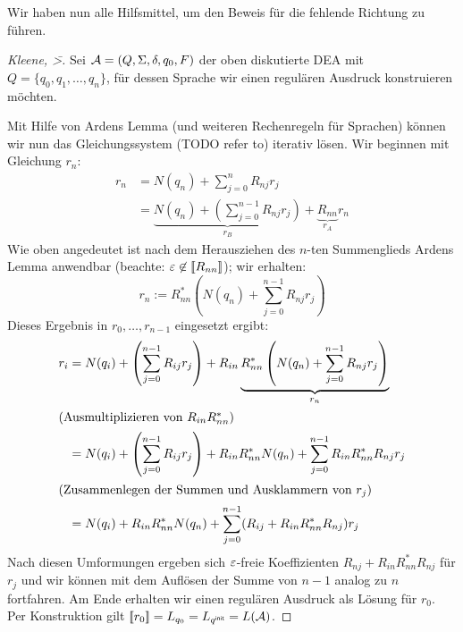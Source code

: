 
\medskip

Wir haben nun alle Hilfsmittel, um den Beweis für die fehlende Richtung zu führen.

\begin{proof}[Kleene, \=>]
  Sei $\mathcal{A}=({Q},\Sigma,\delta,q_0,F)$ der oben diskutierte \acs*{DEA} mit $Q = \{q_0,q_1,\dots,q_n\}$, für dessen Sprache wir einen regulären Ausdruck konstruieren möchten.
  
  Mit Hilfe von Ardens Lemma (und weiteren Rechenregeln für Sprachen) können wir nun das Gleichungssystem (TODO refer to) iterativ lösen.
    Wir beginnen mit Gleichung $r_n$:
    \begin{align*}
      r_n &= N(q_n) + \sum_{j = 0}^n R_{nj} r_j \\
          &= \underbrace{N(q_n) + \left (\sum_{j = 0}^{n-1} R_{nj} r_j \right)}_{r_B} + \underbrace{R_{nn}}_{r_A} r_n
    \end{align*}
    Wie oben angedeutet ist nach dem Herausziehen des $n$-ten Summenglieds Ardens Lemma anwendbar (beachte: $\varepsilon \not \in [\![ R_{nn} ]\!]$); wir erhalten:
    \begin{displaymath}
      r_n := R_{nn}^*\left(N(q_n) + \sum_{j = 0}^{n-1} R_{nj} r_j  \right)
    \end{displaymath}
    Dieses Ergebnis in $r_0,\ldots,r_{n-1}$ eingesetzt ergibt:
    \begin{align*}
      r_i &= N(q_i) + \left (\sum_{j = 0}^{n-1} R_{ij} r_j \right) + R_{in} \underbrace{R_{nn}^*\left(N(q_n) + \sum_{j = 0}^{n-1} R_{nj} r_j  \right)}_{r_n} \\
      \intertext{(Ausmultiplizieren von $R_{in}R_{nn}^*$)}
          &= N(q_i) + \left (\sum_{j = 0}^{n-1} R_{ij} r_j \right) + R_{in}R_{nn}^*N(q_n) + \sum_{j = 0}^{n-1} R_{in}R_{nn}^*R_{nj} r_j  \\
      \intertext{(Zusammenlegen der Summen und Ausklammern von $r_j$)}
          &= N(q_i) + R_{in}R_{nn}^*N(q_n) + \sum_{j = 0}^{n-1} (R_{ij} + R_{in}R_{nn}^*R_{nj}) r_j
    \end{align*}
  Nach diesen Umformungen ergeben sich $\varepsilon$-freie Koeffizienten $R_{nj} + R_{in}R_{nn}^*R_{nj}$ für $r_j$ und wir können mit dem Auflösen der Summe von $n-1$ analog zu $n$ fortfahren.
  Am Ende erhalten wir einen regulären Ausdruck als Lösung für $r_0$.
  Per Konstruktion gilt $[\![ r_0 ]\!] = L_{q_0} = L_{q^\mathsf{init}} = L(\mathcal{A})$.
  \end{proof}
    

